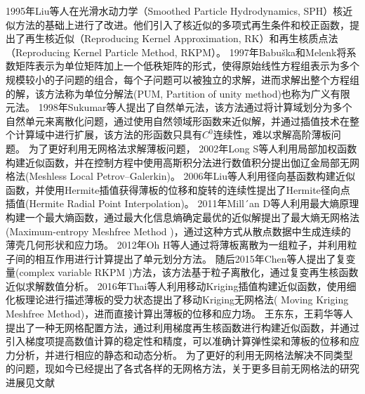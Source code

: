 1995年Liu等人\cite{liu1995}在光滑水动力学（Smoothed Particle Hydrodynamics, SPH）核近似方法的基础上进行了改进。他们引入了核近似的多项式再生条件和校正函数，提出了再生核近似（Reproducing Kernel Approximation, RK）和再生核质点法（Reproducing Kernel Particle Method, RKPM）。
1997年Babuška和Melenk\cite{melenk1996,babuska1997}将系数矩阵表示为单位矩阵加上一个低秩矩阵的形式，使得原始线性方程组表示为多个规模较小的子问题的组合，每个子问题可以被独立的求解，进而求解出整个方程组的解，该方法称为单位分解法(PUM, Partition of unity method)也称为广义有限元法\cite{strouboulis2001}。
1998年Sukumar等人\cite{sukumar1998}提出了自然单元法，该方法通过将计算域划分为多个自然单元来离散化问题，通过使用自然领域形函数来近似解，并通过插值技术在整个计算域中进行扩展，该方法的形函数只具有$C^0$连续性，难以求解高阶薄板问题。
为了更好利用无网格法求解薄板问题，
2002年Long S等人\cite{long2002}利用局部加权函数构建近似函数，并在控制方程中使用高斯积分法进行数值积分提出伽辽金局部无网格法(Meshless Local Petrov–Galerkin)。
2006年Liu等人\cite{liu2006}利用径向基函数构建近似函数，并使用Hermite插值获得薄板的位移和旋转的连续性提出了Hermite径向点插值(Hermite Radial Point Interpolation)。
2011年Mill´an D等人\cite{millan2011}利用最大熵原理构建一个最大熵函数，通过最大化信息熵确定最优的近似解提出了最大熵无网格法(Maximum-entropy Meshfree  Method )，通过这种方式从散点数据中生成连续的薄壳几何形状和应力场。
2012年Oh H等人\cite{oh2012}通过将薄板离散为一组粒子，并利用粒子间的相互作用进行计算提出了单元划分方法。
随后2015年Chen等人\cite{chen2015}提出了复变量(complex variable RKPM )方法，该方法基于粒子离散化，通过复变再生核函数近似求解数值分析。
2016年Thai等人\cite{thai2016}利用移动Kriging插值构建近似函数，使用细化板理论进行描述薄板的受力状态提出了移动Kriging无网格法( Moving Kriging Meshfree Method)，进而直接计算出薄板的位移和应力场。
王东东，王莉华等人\cite{wang2020,wang2021}提出了一种无网格配置方法，通过利用梯度再生核函数进行构建近似函数，并通过引入梯度项提高数值计算的稳定性和精度，可以准确计算弹性梁和薄板的位移和应力分析，并进行相应的静态和动态分析。
为了更好的利用无网格法解决不同类型的问题，现如今已经提出了各式各样的无网格方法\cite{ChengYuMin2005,TanXianYun2011,LianYanPing2013,ZhangXiong2017,GaoXiaoWei2019}，关于更多目前无网格法的研究进展见文献\cite{nguyen2008,liu2009,张雄2009无网格法的理论及应用,wang2014,yreux2017,koester2019,rohit2018,王莉华2021配点型无网格法理论和研究进展,LiuYuXiang2021,朱志辉2021基于,sriram2021,ChenJian2022,LiYuDong2022}

